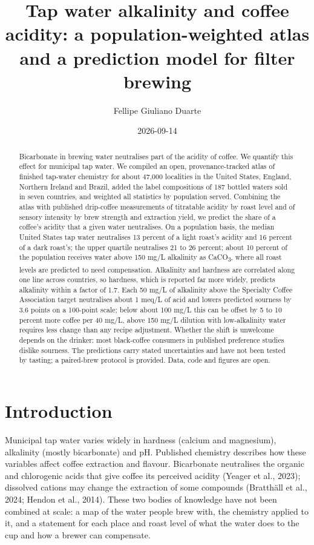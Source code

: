 \documentclass[
  a4paper,
]{article}
\title{Tap water alkalinity and coffee acidity: a population-weighted
atlas and a prediction model for filter brewing}
\author{Fellipe Giuliano Duarte}
\date{2026-09-14}
\begin{document}
\maketitle
\begin{abstract}
Bicarbonate in brewing water neutralises part of the acidity of coffee.
We quantify this effect for municipal tap water. We compiled an open,
provenance-tracked atlas of finished tap-water chemistry for about
47,000 localities in the United States, England, Northern Ireland and
Brazil, added the label compositions of 187 bottled waters sold in seven
countries, and weighted all statistics by population served. Combining
the atlas with published drip-coffee measurements of titratable acidity
by roast level and of sensory intensity by brew strength and extraction
yield, we predict the share of a coffee's acidity that a given water
neutralises. On a population basis, the median United States tap water
neutralises 13 percent of a light roast's acidity and 16 percent of a
dark roast's; the upper quartile neutralises 21 to 26 percent; about 10
percent of the population receives water above 150 mg/L alkalinity as
CaCO\textsubscript{3}, where all roast levels are predicted to need
compensation. Alkalinity and hardness are correlated along one line
across countries, so hardness, which is reported far more widely,
predicts alkalinity within a factor of 1.7. Each 50 mg/L of alkalinity
above the Specialty Coffee Association target neutralises about 1 meq/L
of acid and lowers predicted sourness by 3.6 points on a 100-point
scale; below about 100 mg/L this can be offset by 5 to 10 percent more
coffee per 40 mg/L, above 150 mg/L dilution with low-alkalinity water
requires less change than any recipe adjustment. Whether the shift is
unwelcome depends on the drinker: most black-coffee consumers in
published preference studies dislike sourness. The predictions carry
stated uncertainties and have not been tested by tasting; a paired-brew
protocol is provided. Data, code and figures are open.
\end{abstract}


\section{Introduction}\label{introduction}

Municipal tap water varies widely in hardness (calcium and magnesium),
alkalinity (mostly bicarbonate) and pH. Published chemistry describes
how these variables affect coffee extraction and flavour. Bicarbonate
neutralises the organic and chlorogenic acids that give coffee its
perceived acidity (Yeager et al., 2023); dissolved cations may change
the extraction of some compounds (Bratthäll et al., 2024; Hendon et al.,
2014). These two bodies of knowledge have not been combined at scale: a
map of the water people brew with, the chemistry applied to it, and a
statement for each place and roast level of what the water does to the
cup and how a brewer can compensate.
\end{document}
